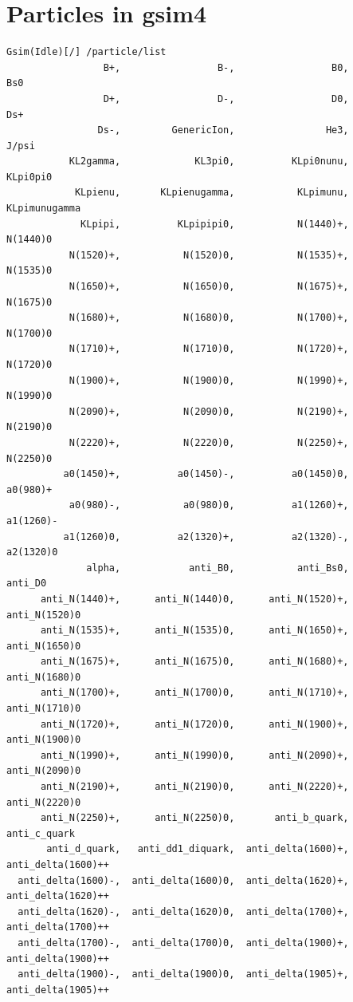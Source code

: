 \documentclass[a4paper,12pt]{article}
\begin{document}
 \section{Particles in gsim4}
 \begin{verbatim}
Gsim(Idle)[/] /particle/list 
                 B+,                 B-,                 B0,                Bs0
                 D+,                 D-,                 D0,                Ds+
                Ds-,         GenericIon,                He3,              J/psi
           KL2gamma,             KL3pi0,          KLpi0nunu,           KLpi0pi0
            KLpienu,       KLpienugamma,           KLpimunu,      KLpimunugamma
             KLpipi,          KLpipipi0,           N(1440)+,           N(1440)0
           N(1520)+,           N(1520)0,           N(1535)+,           N(1535)0
           N(1650)+,           N(1650)0,           N(1675)+,           N(1675)0
           N(1680)+,           N(1680)0,           N(1700)+,           N(1700)0
           N(1710)+,           N(1710)0,           N(1720)+,           N(1720)0
           N(1900)+,           N(1900)0,           N(1990)+,           N(1990)0
           N(2090)+,           N(2090)0,           N(2190)+,           N(2190)0
           N(2220)+,           N(2220)0,           N(2250)+,           N(2250)0
          a0(1450)+,          a0(1450)-,          a0(1450)0,           a0(980)+
           a0(980)-,           a0(980)0,          a1(1260)+,          a1(1260)-
          a1(1260)0,          a2(1320)+,          a2(1320)-,          a2(1320)0
              alpha,            anti_B0,           anti_Bs0,            anti_D0
      anti_N(1440)+,      anti_N(1440)0,      anti_N(1520)+,      anti_N(1520)0
      anti_N(1535)+,      anti_N(1535)0,      anti_N(1650)+,      anti_N(1650)0
      anti_N(1675)+,      anti_N(1675)0,      anti_N(1680)+,      anti_N(1680)0
      anti_N(1700)+,      anti_N(1700)0,      anti_N(1710)+,      anti_N(1710)0
      anti_N(1720)+,      anti_N(1720)0,      anti_N(1900)+,      anti_N(1900)0
      anti_N(1990)+,      anti_N(1990)0,      anti_N(2090)+,      anti_N(2090)0
      anti_N(2190)+,      anti_N(2190)0,      anti_N(2220)+,      anti_N(2220)0
      anti_N(2250)+,      anti_N(2250)0,       anti_b_quark,       anti_c_quark
       anti_d_quark,   anti_dd1_diquark,  anti_delta(1600)+, anti_delta(1600)++
  anti_delta(1600)-,  anti_delta(1600)0,  anti_delta(1620)+, anti_delta(1620)++
  anti_delta(1620)-,  anti_delta(1620)0,  anti_delta(1700)+, anti_delta(1700)++
  anti_delta(1700)-,  anti_delta(1700)0,  anti_delta(1900)+, anti_delta(1900)++
  anti_delta(1900)-,  anti_delta(1900)0,  anti_delta(1905)+, anti_delta(1905)++

\end{verbatim}
\end{document}
